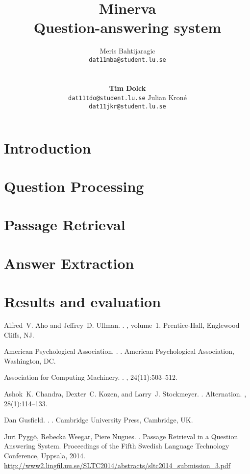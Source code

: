\documentclass[11pt,letterpaper]{article}
\title{Minerva \\ Question-answering system}
\author{Meris Bahtijaragic\\
	    {\tt dat11mba@student.lu.se}
	    \And
      \\
      \\
      \\
      \textbf{Tim Dolck}\\
      {\tt dat11tdo@student.lu.se}
      \And
      Julian Kron\'{e}\\
      {\tt dat11jkr@student.lu.se}
}
\date{}
\begin{document}
\maketitle
\begin{abstract}

\end{abstract}
\section{Introduction}

\section{Question Processing}

\section{Passage Retrieval}

\section{Answer Extraction}

\section{Results and evaluation}


\begin{thebibliography}{}

Alfred~V. Aho and Jeffrey~D. Ullman.
.
, volume~1.
\newblock Prentice-{Hall}, Englewood Cliffs, NJ.

{American Psychological Association}.
.
.
\newblock American Psychological Association, Washington, DC.

{Association for Computing Machinery}.
.
, 24(11):503--512.

Ashok~K. Chandra, Dexter~C. Kozen, and Larry~J. Stockmeyer.
.
\newblock Alternation.
,
  28(1):114--133.

Dan Gusfield.
.
.
\newblock Cambridge University Press, Cambridge, UK.

Juri Pygg\"o, Rebecka Weegar, Piere Nugues.
.
\newblock Passage Retrieval in a Question Answering System. 
\newblock Proceedings of the Fifth Swedish Language Technology Conference, Uppsala, 2014.
\newblock \url{http://www2.lingfil.uu.se/SLTC2014/abstracts/sltc2014_submission_3.pdf}

\end{thebibliography}
\end{document}
